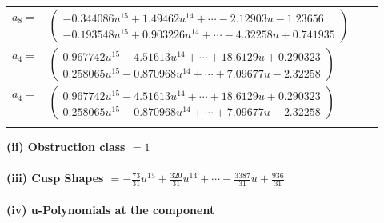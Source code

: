 \documentclass[1p]{elsarticle_modified}
\theoremstyle{definition}
\begin{document}
\begin{tabular}{m{7pt} m{180pt} m{7pt} m{180pt} }
\flushright $a_{8}=$&$\begin{pmatrix}-0.344086 u^{15}+1.49462 u^{14}+\cdots-2.12903 u-1.23656\\-0.193548 u^{15}+0.903226 u^{14}+\cdots-4.32258 u+0.741935\end{pmatrix}$ \\
\flushright $a_{4}=$&$\begin{pmatrix}0.967742 u^{15}-4.51613 u^{14}+\cdots+18.6129 u+0.290323\\0.258065 u^{15}-0.870968 u^{14}+\cdots+7.09677 u-2.32258\end{pmatrix}$\\ \flushright $a_{4}=$&$\begin{pmatrix}0.967742 u^{15}-4.51613 u^{14}+\cdots+18.6129 u+0.290323\\0.258065 u^{15}-0.870968 u^{14}+\cdots+7.09677 u-2.32258\end{pmatrix}$\\&\end{tabular}
\flushleft \textbf{(ii) Obstruction class $= 1$}\\~\\
\flushleft \textbf{(iii) Cusp Shapes $= -\frac{73}{31} u^{15}+\frac{320}{31} u^{14}+\cdots-\frac{3387}{31} u+\frac{936}{31}$}\\~\\
\newpage\renewcommand{\arraystretch}{1}
\flushleft \textbf{(iv) u-Polynomials at the component}\newline \\
\end{document}
